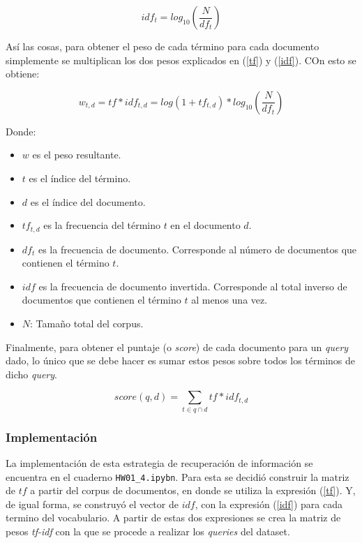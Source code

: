 \begin{equation}
    idf_t = log_{10} \left(\frac{N}{df_t}\right)
    \label{idf}
\end{equation}

Así las cosas, para obtener el peso de cada término para cada documento simplemente se multiplican los dos pesos explicados en (\ref{tf}) y (\ref{idf}). COn esto se obtiene: 

\begin{equation}
    w_{t,d} = tf * idf_{t,d} = log(1 + tf_{t,d}) * log_{10}\left(\frac{N}{df_t}\right)
    \label{eq:tfidf}
\end{equation}

Donde:
\begin{itemize}
    \item $w$ es el peso resultante.
    \item $t$ es el índice del término.
    \item $d$ es el índice del documento.
    \item $tf_{t,d}$ es la frecuencia del término $t$ en el documento $d$.
    \item $df_{t}$ es la frecuencia de documento. Corresponde al número de documentos que contienen el término $t$. 
    \item $idf$ es la frecuencia de documento invertida. Corresponde al total inverso de documentos que contienen el término $t$ al menos una vez.
    \item $N$: Tamaño total del corpus.
\end{itemize}

Finalmente, para obtener el puntaje (o \textit{score}) de cada documento para un \textit{query} dado, lo único que se debe hacer es sumar estos pesos sobre todos los términos de dicho \textit{query}.

\begin{equation}
    score(q,d) = \sum_{t\in q \cap d} tf * idf_{t,d}
\end{equation}

\subsubsection{Implementación}

La implementación de esta estrategia de recuperación de información se encuentra en el cuaderno \texttt{HW01\_4.ipybn}. Para esta se decidió construir la matriz de $tf$ a partir del corpus de documentos, en donde se utiliza la expresión (\ref{tf}). Y, de igual forma, se construyó el vector de $idf$, con la expresión (\ref{idf}) para cada termino del vocabulario. A partir de estas dos expresiones se crea la matriz de pesos \textit{tf-idf} con la que se procede a realizar los \textit{queries} del dataset. \\

